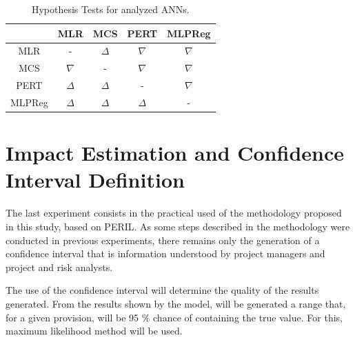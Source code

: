 \begin{table}[h]
\caption{Hypothesis Tests for analyzed ANNs.}\label{tab:teste_hipotese} \centering
\begin{tabular}{|c|c|c|c|c|}
  \hline
   & MLR & MCS & PERT & MLPReg  \\
  \hline
  MLR & - & $\Delta$ & $\nabla$ & $\nabla$   \\
  \hline
  MCS & $\nabla$ & - & $\nabla$ & $\nabla$   \\
  \hline
  PERT & $\Delta$ & $\Delta$ & - & $\nabla$   \\
  \hline
  MLPReg & $\Delta$ & $\Delta$ & $\Delta$ & -   \\
  \hline
\end{tabular}
\end{table}

\section{Impact Estimation and Confidence Interval Definition}

The last experiment consists in the practical used of the methodology proposed in this study, based on PERIL. As some steps described in the methodology were conducted in previous experiments, there remains only the generation of a confidence interval that is information understood by project managers and project and risk analysts.

The use of the confidence interval will determine the quality of the results generated. From the results shown by the model, will be generated a range that, for a given provision, will be 95 \% chance of containing the true value. For this, maximum likelihood method will be used.

